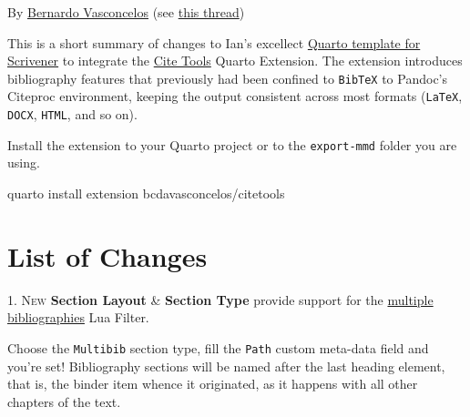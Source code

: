 \documentclass[
  12pt,
  a4paper,
  oneside]{scrbook}
\begin{document}
\protect\hypertarget{scriv27}{}{}

By \href{https://github.com/bcdavasconcelos}{Bernardo Vasconcelos} (see
\href{https://forum.literatureandlatte.com/t/scrivener-quarto-cite-tools-advanced-bibliography-for-a-technical-academic-publishing-workflow/133803}{this
thread})

This is a short summary of changes to Ian's excellect
\href{http://forum.literatureandlatte.com/t/scrivener-quarto-a-technical-academic-publishing-workflow/129769?u=bernardo_vasconcelos}{Quarto
template for Scrivener} to integrate the
\href{http://bcdavasconcelos.github.io/citetools/}{Cite Tools} Quarto
Extension. The extension introduces bibliography features that
previously had been confined to \texttt{BibTeX} to Pandoc's Citeproc
environment, keeping the output consistent across most formats
(\texttt{LaTeX}, \texttt{DOCX}, \texttt{HTML}, and so on).

Install the extension to your Quarto project or to the
\texttt{export-mmd} folder you are using.

quarto install extension bcdavasconcelos/citetools

\hypertarget{list-of-changes}{%
\section{List of Changes}\label{list-of-changes}}

\protect\hypertarget{scriv28}{}{}

\textsc{1. New} \textbf{Section Layout} \& \textbf{Section Type} provide
support for the
\href{https://github.com/pandoc/lua-filters/tree/master/multiple-bibliographies}{multiple
bibliographies} Lua Filter.

\begin{tcolorbox}[enhanced jigsaw, coltitle=black, breakable, opacityback=0, bottomrule=.15mm, colbacktitle=quarto-callout-tip-color!10!white, colback=white, arc=.35mm, title=\textcolor{quarto-callout-tip-color}{\faLightbulb}\hspace{0.5em}{Tip}, bottomtitle=1mm, colframe=quarto-callout-tip-color-frame, left=2mm, leftrule=.75mm, rightrule=.15mm, titlerule=0mm, toptitle=1mm, toprule=.15mm, opacitybacktitle=0.6]

Choose the \texttt{Multibib} section type, fill the \texttt{Path} custom
meta-data field and you're set! Bibliography sections will be named
after the last heading element, that is, the binder item whence it
originated, as it happens with all other chapters of the text.

\end{tcolorbox}
\end{document}
